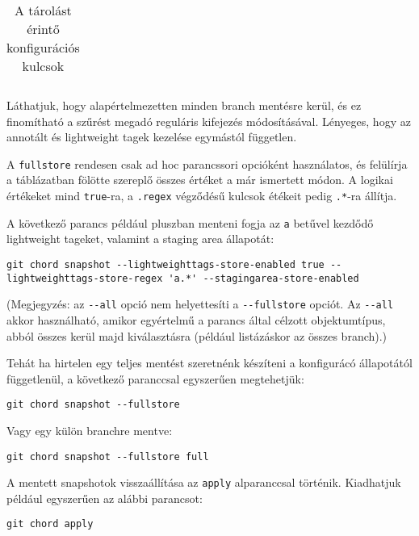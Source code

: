 \documentclass[final]{elteikthesis}[2025/03/25]
\begin{document}
\begin{table}[h]
\begin{center}
\begin{tabular}{|l|l|p{5cm}|}
 \hline

\end{tabular}
\end{center}
\caption{A tárolást érintő konfigurációs kulcsok}
\label{tab:store-config-keys}
\end{table}

Láthatjuk, hogy alapértelmezetten minden branch mentésre kerül,
és ez finomítható a szűrést megadó reguláris kifejezés módosításával.
Lényeges, hogy az annotált és lightweight tagek kezelése egymástól független.

A \verb|fullstore| rendesen csak ad hoc parancssori opcióként használatos,
és felülírja a táblázatban fölötte szereplő összes értéket a már ismertett módon.
A logikai értékeket mind \verb|true|-ra,
a \verb|.regex| végződésű kulcsok étékeit pedig \verb|.*|-ra állítja.

A következő parancs például pluszban menteni fogja az \verb|a| betűvel kezdődő lightweight tageket,
valamint a staging area állapotát:

\begin{verbatim}
git chord snapshot --lightweighttags-store-enabled true --lightweighttags-store-regex 'a.*' --stagingarea-store-enabled
\end{verbatim}

(Megjegyzés: az \verb|--all| opció nem helyettesíti a \verb|--fullstore| opciót.
Az \verb|--all| akkor használható, amikor egyértelmű a parancs által célzott objektumtípus,
abból összes kerül majd kiválasztásra
(például listázáskor az összes branch).)

Tehát ha hirtelen egy teljes mentést szeretnénk készíteni a konfigurácó állapotától függetlenül,
a következő paranccsal egyszerűen megtehetjük:

\begin{verbatim}
git chord snapshot --fullstore
\end{verbatim}

Vagy egy külön branchre mentve:

\begin{verbatim}
git chord snapshot --fullstore full
\end{verbatim}

A mentett snapshotok visszaállítása az \verb|apply| alparanccsal történik.
Kiadhatjuk például egyszerűen az alábbi parancsot:

\begin{verbatim}
git chord apply
\end{verbatim}
\end{document}
